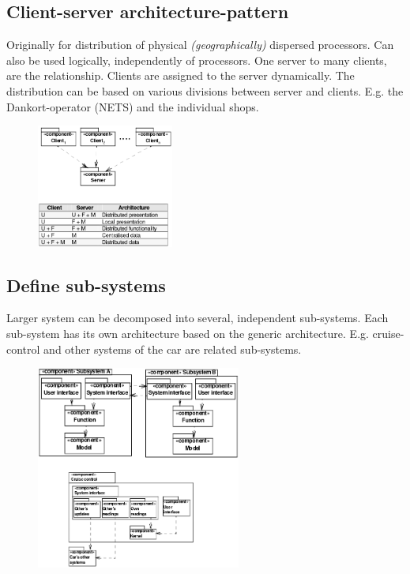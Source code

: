 \subsection{Client-server architecture-pattern}
Originally for distribution of physical \textit{(geographically)} dispersed processors. Can also be used logically, independently of processors. One server to many clients, are the relationship. Clients are assigned to the server dynamically. The distribution can be based on various divisions between server and clients. E.g. the Dankort-operator (NETS) and the individual shops.
\begin{figure}[H]
    \centering
    \includegraphics[width=0.4\textwidth]{figures/clientserverarchitecture.png}
\end{figure}

\subsection{Define sub-systems}
Larger system can be decomposed into several, independent sub-systems. Each sub-system has its own architecture based on the generic architecture. E.g. cruise-control and other systems of the car are related sub-systems.
\begin{figure}[H]
    \centering
    \includegraphics[width=0.6\textwidth]{figures/subsystems.png}
\end{figure}

